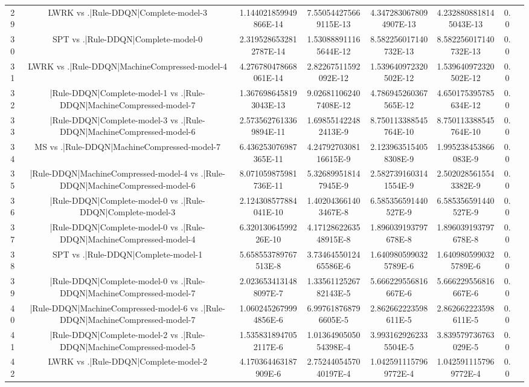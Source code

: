 \documentclass[a3paper,10pt]{article}
\begin{document}
\begin{table}[!htp]
\begin{tabular}{cccccccc}
29&LWRK vs .|Rule-DDQN|Complete-model-3&1.144021859949866E-14&7.550544275669115E-13&4.3472830678094907E-13&4.2328808818145043E-13&0.0\\
30&SPT vs .|Rule-DDQN|Complete-model-0&2.3195286532812787E-14&1.530888911165644E-12&8.582256017140732E-13&8.582256017140732E-13&0.0\\
31&LWRK vs .|Rule-DDQN|MachineCompressed-model-4&4.276780478668061E-14&2.82267511592092E-12&1.539640972320502E-12&1.539640972320502E-12&0.0\\
32&|Rule-DDQN|Complete-model-1 vs .|Rule-DDQN|MachineCompressed-model-7&1.3676986458193043E-13&9.026811062407408E-12&4.786945260367565E-12&4.650175395785634E-12&0.0\\
33&|Rule-DDQN|Complete-model-3 vs .|Rule-DDQN|MachineCompressed-model-6&2.5735627613369894E-11&1.698551422482413E-9&8.750113388545764E-10&8.750113388545764E-10&0.0\\
34&MS vs .|Rule-DDQN|MachineCompressed-model-7&6.436253076987365E-11&4.2479270308116615E-9&2.1239635154058308E-9&1.995238453866083E-9&0.0\\
35&|Rule-DDQN|MachineCompressed-model-4 vs .|Rule-DDQN|MachineCompressed-model-6&8.071059875981736E-11&5.326899518147945E-9&2.5827391603141554E-9&2.5020285615543382E-9&0.0\\
36&|Rule-DDQN|Complete-model-0 vs .|Rule-DDQN|Complete-model-3&2.124308577884041E-10&1.402043661403467E-8&6.585356591440527E-9&6.585356591440527E-9&0.0\\
37&|Rule-DDQN|Complete-model-0 vs .|Rule-DDQN|MachineCompressed-model-4&6.32013064599226E-10&4.1712862263548915E-8&1.896039193797678E-8&1.896039193797678E-8&0.0\\
38&SPT vs .|Rule-DDQN|Complete-model-1&5.658553789767513E-8&3.7346455012465586E-6&1.6409805990325789E-6&1.6409805990325789E-6&0.0\\
39&|Rule-DDQN|Complete-model-0 vs .|Rule-DDQN|MachineCompressed-model-7&2.0236534131488097E-7&1.3356112526782143E-5&5.666229556816667E-6&5.666229556816667E-6&0.0\\
40&|Rule-DDQN|MachineCompressed-model-6 vs .|Rule-DDQN|MachineCompressed-model-7&1.0602452679994856E-6&6.997618768796605E-5&2.862662223598611E-5&2.862662223598611E-5&0.0\\
41&|Rule-DDQN|Complete-model-2 vs .|Rule-DDQN|MachineCompressed-model-5&1.5358318947052117E-6&1.0136490505054398E-4&3.9931629262335504E-5&3.839579736763029E-5&0.0\\
42&LWRK vs .|Rule-DDQN|Complete-model-2&4.170364463187909E-6&2.7524405457040197E-4&1.0425911157969772E-4&1.0425911157969772E-4&0.0\\

\end{tabular}
\end{table}
\end{document}
